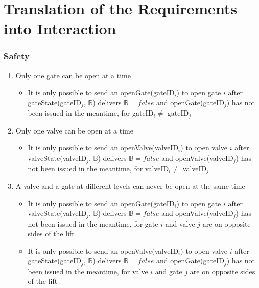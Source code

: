 \section{Translation of the Requirements into Interaction}

\subsubsection*{Safety}
\begin{enumerate}
	\item Only one gate can be open at a time
		\begin{itemize}
			\item It is only possible to send an openGate(gateID$_i$) to open gate $i$ after gateState(gateID$_j$, $ \mathbb{B} $) delivers $\mathbb{B} = false$ and openGate(gateID$_j$) has not been issued in the meantime, for gateID$_i \neq$ gateID$_j$
		\end{itemize}
	
	\item Only one valve can be open at a time
		\begin{itemize}
			\item It is only possible to send an openValve(valveID$_i$) to open valve $i$ after valveState(valveID$_j$, $ \mathbb{B} $) delivers $\mathbb{B} = false$ and openValve(valveID$_j$) has not been issued in the meantime, for valveID$_i \neq$ valveID$_j$
		\end{itemize}
	
	\item A valve and a gate at different levels can never be open at the same time
		\begin{itemize}
			\item It is only possible to send an openGate(gateID$_i$) to open gate $i$ after valveState(valveID$_j$, $ \mathbb{B} $) delivers $\mathbb{B} = false$ and openValve(valveID$_j$) has not been issued in the meantime, for gate $i$ and valve $j$ are on opposite sides of the lift 
			\item It is only possible to send an openValve(valveID$_i$) to open valve $i$ after gateState(gateID$_j$, $ \mathbb{B} $) delivers $\mathbb{B} = false$ and openGate(gateID$_j$) has not been issued in the meantime, for valve $i$ and gate $j$ are on opposite sides of the lift
		\end{itemize}
	
	

\end{enumerate}
